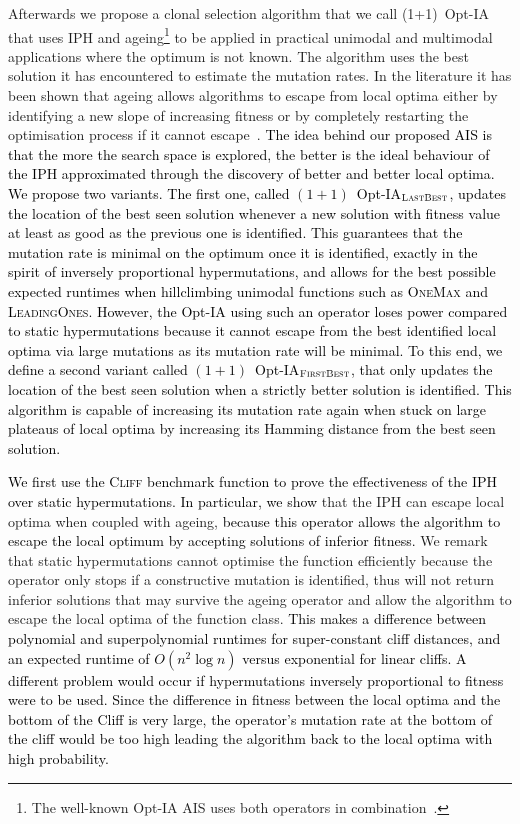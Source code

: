 \documentclass[lettersize,journal]{IEEEtran}
\newcommand{\new}[1]{\textcolor{black}{#1}}
\begin{document}
Afterwards we propose a clonal selection algorithm that we call (1+1)~Opt-IA
that uses IPH and ageing\footnote{The well-known Opt-IA AIS uses both operators in combination~\cite{CutelloNicosiaPavoneTimmis2007}.} \cite{CutelloNicosiaPavoneTimmis2007} to be applied in practical unimodal and multimodal applications where the optimum is not known. 
The algorithm uses the best solution it has encountered to estimate the mutation rates.
In the literature it has been shown that ageing allows algorithms to escape from local optima either by identifying a new slope of increasing fitness or by completely restarting the optimisation process if it cannot escape~\cite{OlivetoSudholt2014ageing,CorusOlivetoYazdaniGECCO2017,CorusOlivetoYazdaniAIJ2019,HorobaJansenZarges09,JansenZarges2011}. 
\new{The idea behind our proposed AIS is that the more the search space is explored, the better is the ideal behaviour of the IPH approximated through the discovery of better and better local optima.
We propose two variants. The first one, called $(1+1)$~Opt-IA$_{\textsc{LastBest}}$, updates the location of the best seen solution whenever a new solution with fitness value at least as good as the previous one is identified. This guarantees that the mutation rate is minimal on the optimum once it is identified, exactly in the spirit of inversely proportional hypermutations, and allows for the best possible expected runtimes when hillclimbing unimodal functions such as \textsc{OneMax} and \textsc{LeadingOnes}. However, the Opt-IA using such an operator loses power compared to static hypermutations because it cannot escape from the best identified local optima via large mutations as its mutation rate will be minimal. To this end, we define a second variant called $(1+1)$~Opt-IA$_{\textsc{FirstBest}}$, that only updates the location of the best seen solution when a strictly better solution is identified. This algorithm is capable of increasing its mutation rate again when stuck on large plateaus of local optima by increasing its Hamming distance from the best seen solution.
}

\new{We first use the \textsc{Cliff} benchmark function to prove the effectiveness of the IPH over static hypermutations. In particular, we show} 
that the IPH can escape local optima when coupled with ageing, \new{because this operator allows the algorithm to escape the local optimum by accepting solutions of inferior fitness.} We remark that static hypermutations cannot optimise the function efficiently because the operator only stops if a constructive mutation is identified, thus will not return inferior solutions that may survive the ageing operator and allow the algorithm to escape the local optima of the function class. \new{This makes a difference between polynomial and superpolynomial runtimes for super-constant cliff distances, and an expected runtime of $O(n^2 \log n)$ versus exponential for linear cliffs. 
A different problem would occur if hypermutations inversely proportional to fitness were to be used. Since the difference in fitness between the local optima and the bottom of the Cliff is very large, the operator's mutation rate at the bottom of the cliff would be too high leading the algorithm back to the local optima with high probability.}
\end{document}
